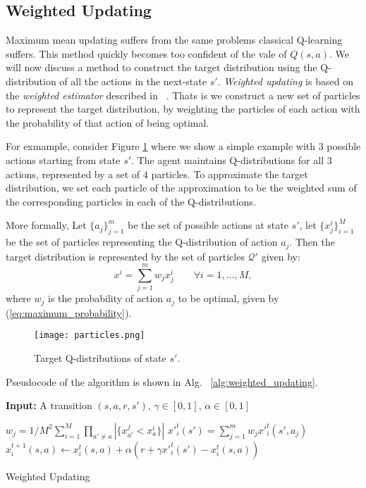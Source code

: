 \subsection{Weighted Updating}
Maximum mean updating suffers from the same problems classical Q-learning suffers. This method quickly becomes too confident of the vale of $Q(s,a)$. We will now discuss a method to construct the target distribution using the Q-distribution of all the actions  in the next-state $s'$. \emph{Weighted updating} is based on the \emph{weighted estimator} described in ~\cite{pmlr-v48-deramo16}. Thats is we construct a new set of particles to represent the target distribution, by weighting the particles of each action with the probability of that action of being optimal. \par
For exmample, consider Figure \ref{fig:target_distributions} where we show a simple example with 3 possible actions starting from state $s'$. The agent maintains Q-distributions for all 3 actions, represented by a set of 4 particles. To approximate the target distribution, we set each particle of the approximation to be the weighted sum of the corresponding particles in each of the Q-distributions. \par
More formally, Let $\{ a_j\}_{j=1}^{m}$ be the set of possible actions at state $s'$, let $\{x^i_j\}_{i=1}^{M}$ be the set of particles representing the Q-distribution of action $a_j$. Then the target distribution is represented by the set of particles $\mathcal{Q}'$ given by:
\begin{equation}
	x^i= \sum_{j=1}^{m} w_j x^i_j \qquad \forall i=1,\ldots,M,
\end{equation}
where $w_j$ is the probability of action $a_j$ to be optimal, given by (\ref{eq:maximum_probability}).
\begin{figure}
 \texttt{[image: particles.png]}
 \caption{Target Q-distributions of state $s'$.}
 \label{fig:target_distributions}
\end{figure}
Pseudocode of the algorithm is shown in Alg. ~\ref{alg:weighted_updating}. 
\begin{algorithm}[H]
\begin{flushleft}
 \textbf{Input:} A transition $(s,a,r,s')$, $\gamma \in [0,1]$, $\alpha \in [0,1]$\\
\end{flushleft}
 \begin{algorithmic}
 
 		\State $w_j =1/M^2 \sum_{i=1}^M \prod_{a' \neq a} |\{ x_{a'}^j < x_{a}^i \} |$
 \EndFor
 		\State $x'^{t}_i(s')= \sum_{j=1}^{m} w_j x'^{t}_i(s',a_j)$ 
 		\State $x^{t+1}_i(s,a) \leftarrow x^{t}_i(s,a) + \alpha (r+\gamma x'^{t}_i(s') - x^{t}_i(s,a))$
 \EndFor
 \end{algorithmic}
 \caption{Weighted Updating}
 \label{alg:weighted_updating}
\end{algorithm}  
